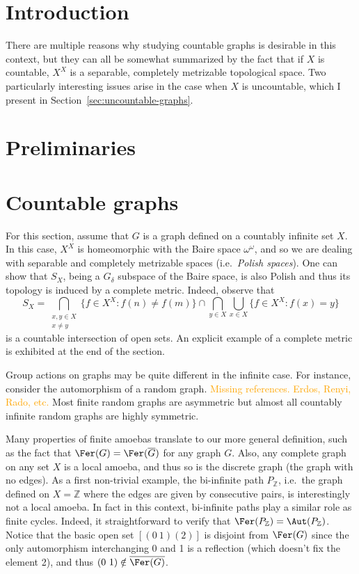 \documentclass[12pt]{article}
\begin{document}

\section{Introduction}\label{sec:inf-amoebas-intro}

There are multiple reasons why studying countable graphs is desirable in this context, but they can all be somewhat summarized by the fact that if $X$ is countable, $X^X$ is a separable, completely metrizable topological space.
Two particularly interesting issues arise in the case when $X$ is uncountable, which I present in Section~\ref{sec:uncountable-graphs}.

\section{Preliminaries}\label{sec:inf-amoebas-prelim}

\section{Countable graphs}\label{sec:countable-graphs}

For this section, assume that $G$ is a graph defined on a countably infinite set $X$.
In this case, $X^X$ is homeomorphic with the Baire space $\omega^\omega$, and so we are dealing with separable and completely metrizable spaces (i.e.\ \emph{Polish spaces}).
One can show that $S_X$, being a $G_\delta$ subspace of the Baire space, is also Polish and thus its topology is induced by a complete metric. Indeed, observe that $$S_X=\bigcap_{\substack{x,y\in X \\ x\neq y}}\{f\in X^X:f(n)\neq f(m)\}\cap\bigcap_{y\in X}\bigcup_{x\in X}\{f\in X^X:f(x)=y\}$$ is a countable intersection of open sets.
An explicit example of a complete metric is exhibited at the end of the section.

Group actions on graphs may be quite different in the infinite case.
For instance, consider the automorphism of a random graph. \textcolor{orange}{Missing references.
Erdos, Renyi, Rado, etc.} Most finite random graphs are asymmetric but almost all countably infinite random graphs are highly symmetric.

Many properties of finite amoebas translate to our more general definition, such as the fact that $\Fer(G)=\Fer(\overline G)$ for any graph $G$.
Also, any complete graph on any set $X$ is a local amoeba, and thus so is the discrete graph (the graph with no edges).
As a first non-trivial example, the bi-infinite path $P_\mathbb Z$, i.e.\ the graph defined on $X=\mathbb Z$ where the edges are given by consecutive pairs, is interestingly not a local amoeba.
In fact in this context, bi-infinite paths play a similar role as finite cycles.
Indeed, it straightforward to verify that $\Fer(P_\mathbb Z)=\Aut(P_\mathbb Z)$.
Notice that the basic open set $[(0\ 1)(2)]$ is disjoint from $\Fer(G)$ since the only automorphism interchanging 0 and 1 is a reflection (which doesn't fix the element 2), and thus $(0\ 1)\notin\overline{\Fer(G)}$.
\end{document}

